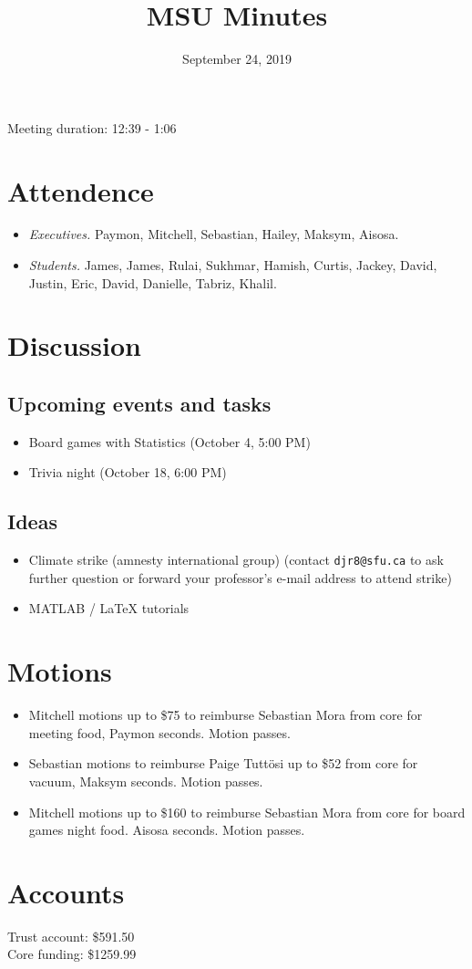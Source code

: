 \documentclass[12pt]{article}
\title{MSU Minutes}
\date{September 24, 2019}
\begin{document}
\maketitle

Meeting duration: 12:39 - 1:06

\section*{Attendence}
\begin{itemize}
\item \textit{Executives.} Paymon, Mitchell, Sebastian, Hailey, Maksym, Aisosa.
\item \textit{Students.} James, James, Rulai, Sukhmar, Hamish, Curtis, Jackey, David, Justin, Eric, David, Danielle, Tabriz, Khalil.
\end{itemize}

\section*{Discussion}
\subsection*{Upcoming events and tasks}
\begin{itemize}
\item Board games with Statistics (October 4, 5:00 PM)
\item Trivia night (October 18, 6:00 PM)
\end{itemize}
\subsection*{Ideas}
\begin{itemize}
\item Climate strike (amnesty international group) (contact \texttt{djr8@sfu.ca} to ask further question or forward your professor's e-mail address to attend strike)
\item MATLAB / LaTeX tutorials
\end{itemize}

\section*{Motions}
\begin{itemize}
\item Mitchell motions up to \$75 to reimburse Sebastian Mora from core for meeting food, Paymon seconds. Motion passes.
\item Sebastian motions to reimburse Paige Tuttösi up to \$52 from core for vacuum, Maksym seconds. Motion passes.
\item Mitchell motions up to \$160 to reimburse Sebastian Mora from core for board games night food. Aisosa seconds. Motion passes.
\end{itemize}

\section*{Accounts}

Trust account: \$591.50 \\
Core funding: \$1259.99 \\
\end{document}
